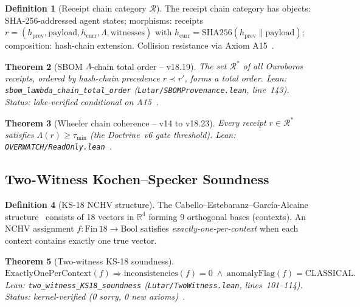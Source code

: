 \documentclass[11pt,letterpaper]{article}
\newtheorem{theorem}{Theorem}[section]
\theoremstyle{definition}
\newtheorem{definition}[theorem]{Definition}
\theoremstyle{remark}
\begin{document}
\begin{definition}[Receipt chain category \(\mathcal{R}\)]
The receipt chain category has objects: SHA-256-addressed agent states;
morphisms: receipts \(r = (h_{\mathrm{prev}}, \mathrm{payload},
h_{\mathrm{curr}}, \Lambda, \mathrm{witnesses})\) with
\(h_{\mathrm{curr}} = \mathrm{SHA256}(h_{\mathrm{prev}} \| \mathrm{payload})\);
composition: hash-chain extension.
Collision resistance via Axiom A15~\cite{NIST-FIPS-180-4}.
\end{definition}

\begin{theorem}[SBOM \(\Lambda\)-chain total order -- v18.19]
\label{thm:total-order}
The set \(\mathcal{R}^*\) of all Ouroboros receipts, ordered by
hash-chain precedence \(r \prec r'\), forms a total order.
\textup{Lean:} \texttt{sbom\_lambda\_chain\_total\_order}
(\texttt{Lutar/SBOMProvenance.lean}, line~143).
Status: lake-verified conditional on A15~\cite{LutarThesisV18}.
\end{theorem}

\begin{theorem}[Wheeler chain coherence -- v14 to v18.23]
\label{thm:wheeler-coherence}
Every receipt \(r \in \mathcal{R}^*\) satisfies
\(\Lambda(r) \ge \tau_{\min}\) (the Doctrine~v6 gate threshold).
\textup{Lean:} \texttt{OVERWATCH/ReadOnly.lean}~\cite{LutarThesisV17}.
\end{theorem}

\subsection{Two-Witness Kochen--Specker Soundness}

\begin{definition}[KS-18 NCHV structure]
The Cabello--Estebaranz--Garc{\'i}a-Alcaine structure~\cite{Cabello1996}
consists of 18 vectors in \(\mathbb{R}^4\) forming 9 orthogonal bases
(contexts).
An NCHV assignment \(f : \mathrm{Fin}\,18 \to \mathrm{Bool}\) satisfies
\emph{exactly-one-per-context} when each context contains exactly one
true vector.
\end{definition}

\begin{theorem}[Two-witness KS-18 soundness]
\label{thm:ks18-sound}
\(
  \mathrm{ExactlyOnePerContext}(f)
  \Rightarrow
  \mathrm{inconsistencies}(f) = 0
  \;\wedge\;
  \mathrm{anomalyFlag}(f) = \mathrm{CLASSICAL}.
\)
\textup{Lean:} \texttt{two\_witness\_KS18\_soundness}
(\texttt{Lutar/TwoWitness.lean}, lines~101--114).
Status: kernel-verified (0 sorry, 0 new axioms)~\cite{LutarThesisV17}.
\end{theorem}
\end{document}
